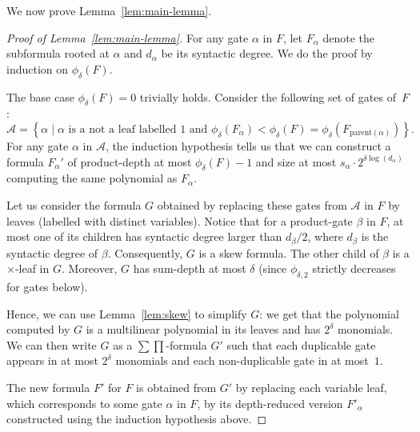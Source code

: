 \documentclass[10pt,a4paper]{article}
\newcommand{\comment}[2]{\marginpar{\tiny{\textbf{#1: }\textit{#2}}}}
\newcommand{\gm}[1]{\comment{GM}{#1}}
\begin{document}
We now prove Lemma~\ref{lem:main-lemma}. 
\begin{proof}[Proof of Lemma~\ref{lem:main-lemma}]
	For any gate $\alpha$ in $F$, let $F_\alpha$ denote the subformula rooted at $\alpha$ and \(d_{\alpha}\) be its syntactic degree. We do the proof by induction on \(\phi_{\delta}(F)\).
	
	The base case $\phi_\delta(F) = 0$ trivially holds. 
	Consider the following set of gates of~$F$: 
	\[ \mathcal{A} = \left\{\alpha \mid \alpha \text{ is a not a leaf labelled~$1$  and }\phi_{\delta}(F_\alpha)  < \phi_{\delta}(F) = \phi_{\delta}(F_{\text{parent}(\alpha)})\right\}.\] 
	For any gate \(\alpha\) in \(\mathcal{A}\), the induction hypothesis tells us that we can construct a formula $F_\alpha'$ of product-depth at most \(\phi_{\delta}(F)-1\)  and size at most \(s_{\alpha}\cdot 2^{\delta \log(d_\alpha)}\) computing the same polynomial as $F_\alpha.$
	
	Let us consider the formula \(G\) obtained by replacing these gates from $\mathcal{A}$ in \(F\)  by leaves (labelled with distinct variables). Notice that for a product-gate \(\beta\) in $F$, at most one of its children has syntactic degree larger than \(d_{\beta}/2\), where $d_\beta$ is the syntactic degree of $\beta$. Consequently, \(G\) is a skew formula.  The other child of $\beta$ is a $\times$-leaf in $G$. Moreover, \(G\) has sum-depth at most \(\delta\) (since \(\phi_{\delta,2}\) strictly decreases for gates below). 
	
	Hence, we can use Lemma~\ref{lem:skew} to simplify $G$: we get that the polynomial computed by $G$ is a multilinear polynomial in its leaves and has $2^\delta$ monomials. We can then  write $G$ as a \(\sum\prod\)-formula $G'$    such that each duplicable gate appears in  at most $2^\delta$ monomials and each non-duplicable gate in at most~$1$.
	
	The new formula $F'$ for $F$ is obtained from $G'$ by replacing each variable leaf, which corresponds to some gate $\alpha$ in $F$, by its depth-reduced version $F'_\alpha$ constructed using the induction hypothesis above.
	

\end{proof}
\end{document}
